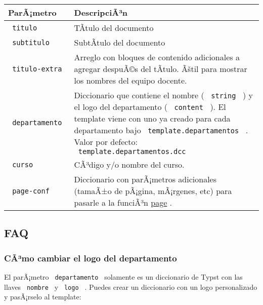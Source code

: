 \begin{longtable}[]{@{}ll@{}}
\toprule\noalign{}
ParÃ¡metro & DescripciÃ³n \\
\midrule\noalign{}
\endhead
\bottomrule\noalign{}
\endlastfoot
\texttt{\ titulo\ } & TÃ­tulo del documento \\
\texttt{\ subtitulo\ } & SubtÃ­tulo del documento \\
\texttt{\ titulo-extra\ } & Arreglo con bloques de contenido adicionales
a agregar despuÃ©s del tÃ­tulo. Ãštil para mostrar los nombres del equipo
docente. \\
\texttt{\ departamento\ } & Diccionario que contiene el nombre (
\texttt{\ string\ } ) y el logo del departamento ( \texttt{\ content\ }
). El template viene con uno ya creado para cada departamento bajo
\texttt{\ template.departamentos\ } . Valor por defecto:
\texttt{\ template.departamentos.dcc\ } \\
\texttt{\ curso\ } & CÃ³digo y/o nombre del curso. \\
\texttt{\ page-conf\ } & Diccionario con parÃ¡metros adicionales
(tamaÃ±o de pÃ¡gina, mÃ¡rgenes, etc) para pasarle a la funciÃ³n
\href{https://typst.app/docs/reference/layout/page/}{page} . \\
\end{longtable}

\subsection{FAQ}\label{faq}

\subsubsection{CÃ³mo cambiar el logo del
departamento}\label{cuxe3uxb3mo-cambiar-el-logo-del-departamento}

El parÃ¡metro \texttt{\ departamento\ } solamente es un diccionario de
Typst con las llaves \texttt{\ nombre\ } y \texttt{\ logo\ } . Puedes
crear un diccionario con un logo personalizado y pasÃ¡rselo al template:

\begin{Shaded}
\begin{Highlighting}[]

\NormalTok{)}

\NormalTok{)}
\end{Highlighting}
\end{Shaded}

